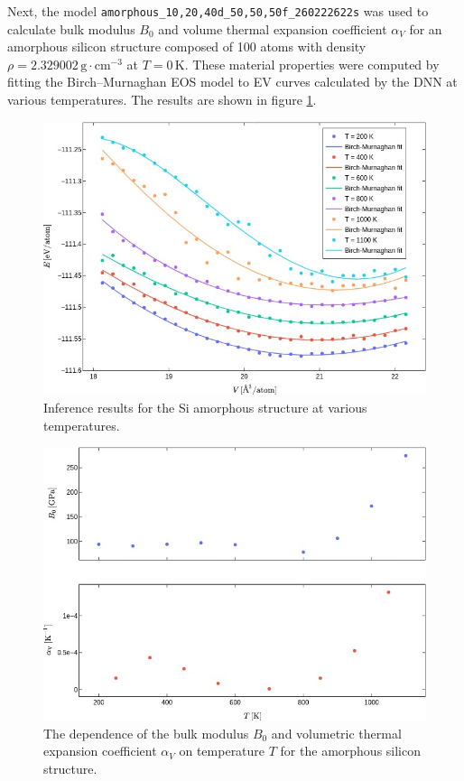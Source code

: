 Next, the model \texttt{amorphous\_10,20,40d\_50,50,50f\_260222622s} was used
to calculate bulk modulus $B_0$ and volume thermal expansion coefficient
$\alpha_{V}$ for an amorphous silicon structure composed of 100 atoms with
density $\rho = 2.329002 \, \mathrm{g} \cdot \mathrm{cm}^{-3}$ at
$T = 0 \, \mathrm{K}$. These material properties were computed by fitting
the Birch--Murnaghan EOS model to EV curves calculated by the DNN at various
temperatures. The results are shown in figure \ref{fig:amorphous_inference}.

\begin{figure}
  \begin{center}
    \includegraphics[width=.8\textwidth]{
      asset/amorphous_ev_curves.jpg
    }
  \end{center}
  \caption{Inference results for the Si amorphous structure at various
  temperatures.}
  \label{fig:amorphous_inference}
\end{figure}

\begin{figure}
  \begin{center}
    \includegraphics[width=.8\textwidth]{
      asset/amorphous_properties.jpg
    }
  \end{center}
  \caption{The dependence of the bulk modulus $B_0$ and volumetric thermal
  expansion coefficient $\alpha_V$ on temperature $T$ for the amorphous
  silicon structure.}
  \label{fig:amorphous_properties}
\end{figure}

